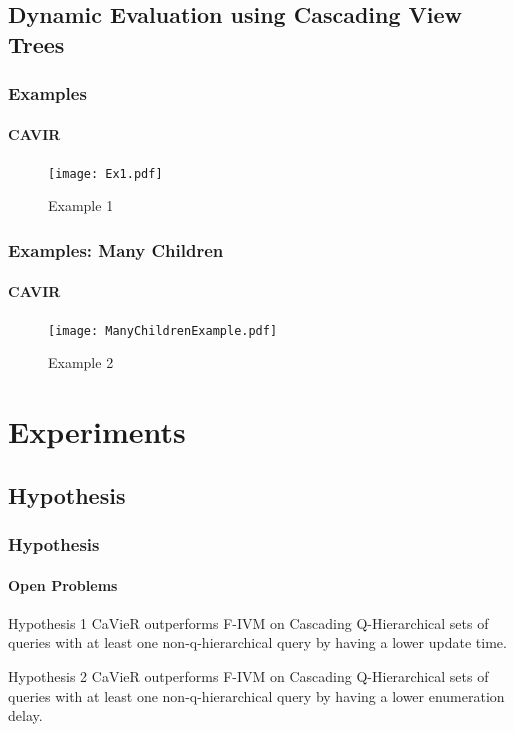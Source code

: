 \documentclass[
	11pt, %
]{beamer}
\begin{document}
\subsection{Dynamic Evaluation using Cascading View Trees}
\begin{frame}
	\frametitle{Examples}
	\framesubtitle{CAVIR}
	\begin{figure}
		\texttt{[image: Ex1.pdf]}
		\caption{Example 1}
	\end{figure}
\end{frame}

\begin{frame}
	\frametitle{Examples: Many Children}
	\framesubtitle{CAVIR}
	\begin{figure}
		\texttt{[image: ManyChildrenExample.pdf]}
		\caption{Example 2}
	\end{figure}
\end{frame}

\section{Experiments}
\subsection{Hypothesis}
\begin{frame}
	\frametitle{Hypothesis}
	\framesubtitle{Open Problems}
	\begin{block}{Hypothesis 1 }\label{hyp:initialUpdate}
		CaVieR outperforms F-IVM on Cascading Q-Hierarchical sets of queries with at least one non-q-hierarchical query by having a lower update time.
	\end{block}
	
	\begin{block}{Hypothesis 2}\label{hyp:initialEnumeration}
		CaVieR outperforms F-IVM on Cascading Q-Hierarchical sets of queries with at least one non-q-hierarchical query by having a lower enumeration delay.
	\end{block}

\end{frame}
\end{document}
